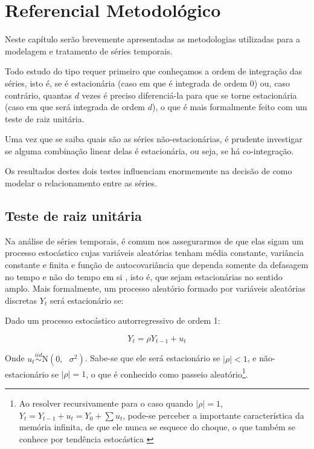 \documentclass[a4paper,
               article,
               12pt,
               openany,
               oneside,
               english,
               brazil]{abntex2}
\numberwithin{equation}{section}
\begin{document}
\section{Referencial Metodológico}

    Neste capítulo serão brevemente apresentadas as metodologias utilizadas para a modelagem e tratamento de séries temporais.

    Todo estudo do tipo requer primeiro que conheçamos a ordem de integração das séries, isto é, se é estacionária (caso em que é integrada de ordem 0) ou, caso contrário, quantas $d$ vezes é preciso diferenciá-la para que se torne estacionária (caso em que será integrada de ordem $d$), o que é mais formalmente feito com um teste de raiz unitária.

    Uma vez que se saiba quais são as séries não-estacionárias, é prudente investigar se alguma combinação linear delas é estacionária, ou seja, se há co-integração.

    Os resultados destes dois testes influenciam enormemente na decisão de como modelar o relacionamento entre as séries. 

    \subsection{Teste de raiz unitária}

    Na análise de séries temporais, é comum nos assegurarmos de que elas sigam um processo estocástico cujas variáveis aleatórias tenham média constante, variância constante e finita e função de autocovariância que dependa somente da defasagem no tempo e não do tempo em si \cite[p.~734]{gujarati}, isto é, que sejam estacionárias no sentido amplo. Mais formalmente, um processo aleatório formado por variáveis aleatórias discretas $Y_t$ será estacionário se:

    Dado um processo estocástico autorregressivo de ordem 1:

    \begin{equation}\label{processo_estocastico} Y_t = \rho Y_{t-1} + u_t \end{equation}

    Onde $ u_t \stackrel{iid}{\sim} \text{N}(0,\text{ }\sigma^2) $. Sabe-se que ele será estacionário se $ \lvert \rho \rvert < 1 $, e não-estacionário se $ \lvert \rho \rvert = 1 $, o que é conhecido como passeio aleatório\footnote{Ao resolver recursivamente para o caso quando $ \lvert \rho \rvert = 1 $, $ Y_t = Y_{t-1} + u_t = Y_0 + \sum u_t $, pode-se perceber a importante característica da memória infinita, de que ele nunca se esquece do choque, o que também se conhece por tendência estocástica \cite[p.~736]{gujarati}}.
\end{document}
